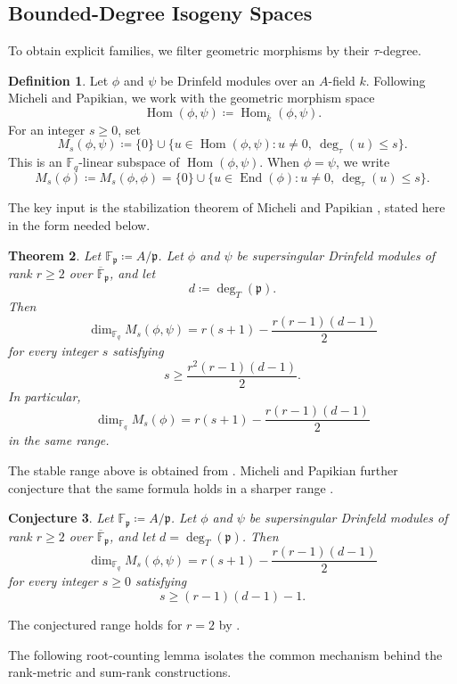 \documentclass[10pt,a4paper]{amsart}
\DeclareMathOperator{\End}{End}
\DeclareMathOperator{\Hom}{Hom}
\theoremstyle{definition}
\newtheorem{definition}{Definition}[section]
\theoremstyle{plain}
\newtheorem{theorem}[definition]{Theorem}
\newtheorem{conjecture}[definition]{Conjecture}
\theoremstyle{remark}
\newcommand{\vF}{\mathbb F}
\newcommand{\p}{\mathfrak p}
\begin{document}
\subsection{Bounded-Degree Isogeny Spaces}

To obtain explicit families, we filter geometric morphisms by their $\tau$-degree.

\begin{definition}
Let $\phi$ and $\psi$ be Drinfeld modules over an $A$-field $k$. Following Micheli and Papikian, we work with the geometric morphism space
$$
\Hom(\phi,\psi)\coloneqq \Hom_{\overline{k}}(\phi,\psi).
$$
For an integer $s\geq 0$, set
$$
M_s(\phi,\psi)
\coloneqq
\{0\}\cup\{u\in \Hom(\phi,\psi):u\neq 0,\ \deg_\tau(u)\leq s\}.
$$
This is an $\vF_q$-linear subspace of $\Hom(\phi,\psi)$. When $\phi=\psi$, we write
$$
M_s(\phi)\coloneqq M_s(\phi,\phi)
=
\{0\}\cup\{u\in \End(\phi):u\neq 0,\ \deg_\tau(u)\leq s\}.
$$
\end{definition}

The key input is the stabilization theorem of Micheli and Papikian
\cite[Theorem 1.1]{MP26Stable}, stated here in the form needed below.

\begin{theorem}
Let $\vF_{\p}\coloneqq A/\p$.  Let $\phi$ and $\psi$ be supersingular
Drinfeld modules of rank $r\geq 2$ over $\overline{\vF}_{\p}$, and let
$$
d\coloneqq \deg_T(\p).
$$
Then
$$
\dim_{\vF_q} M_s(\phi,\psi)
=
r(s+1)-\frac{r(r-1)(d-1)}{2}
$$
for every integer $s$ satisfying
$$
s\geq \frac{r^2(r-1)(d-1)}{2}.
$$
In particular,
$$
\dim_{\vF_q} M_s(\phi)
=
r(s+1)-\frac{r(r-1)(d-1)}{2}
$$
in the same range.
\end{theorem}

The stable range above is obtained from
\cite[Proposition 3.19]{MP26Stable}.  Micheli and Papikian further conjecture
that the same formula holds in a sharper range
\cite[Conjecture 3.10]{MP26Stable}.

\begin{conjecture}
Let $\vF_{\p}\coloneqq A/\p$.  Let $\phi$ and $\psi$ be supersingular
Drinfeld modules of rank $r\geq 2$ over $\overline{\vF}_{\p}$, and let
$d=\deg_T(\p)$.  Then
$$
\dim_{\vF_q} M_s(\phi,\psi)
=
r(s+1)-\frac{r(r-1)(d-1)}{2}
$$
for every integer $s\geq 0$ satisfying
$$
s\geq (r-1)(d-1)-1.
$$
\end{conjecture}

The conjectured range holds for $r=2$ by
\cite[Theorem 1.2]{MP26Stable}.

The following root-counting lemma isolates the common mechanism behind the
rank-metric and sum-rank constructions.
\end{document}
